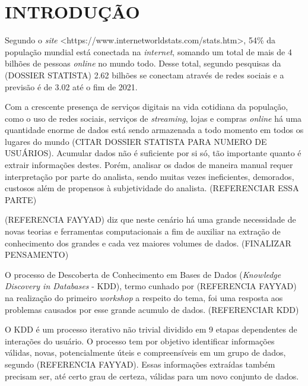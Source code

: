 
%

\chapter{INTRODUÇÃO}
\label{chap:introducao}

Segundo o \textit{site} <https://www.internetworldstats.com/stats.htm>, 54\% da população mundial está conectada na \textit{internet}, somando um total de mais de 4 bilhões de pessoas \textit{online} no mundo todo. Desse total, segundo pesquisas da (DOSSIER STATISTA) 2.62 bilhões se conectam através de redes sociais e a previsão é de 3.02 até o fim de 2021.

Com a crescente presença de serviços digitais na vida cotidiana da população, como o uso de redes sociais, serviços de \textit{streaming}, lojas e compras \textit{online} há uma quantidade enorme de dados está sendo armazenada a todo momento em todos os lugares do mundo (CITAR DOSSIER STATISTA PARA NUMERO DE USUÁRIOS). Acumular dados não é suficiente por si só, tão importante quanto é extrair informações destes. Porém, analisar os dados de maneira manual requer interpretação por parte do analista, sendo muitas vezes ineficientes, demorados, custosos além de propensos à subjetividade do analista. (REFERENCIAR ESSA PARTE)

(REFERENCIA FAYYAD) diz que neste cenário há uma grande necessidade de novas teorias e ferramentas computacionais a fim de auxiliar na extração de conhecimento dos grandes e cada vez maiores volumes de dados. (FINALIZAR PENSAMENTO)

O processo de Descoberta de Conhecimento em Bases de Dados (\textit{Knowledge Discovery in Databases} - KDD), termo cunhado por (REFERENCIA FAYYAD) na realização do primeiro \textit{workshop} a respeito do tema, foi uma resposta aos problemas causados por esse grande acumulo de dados. (REFERENCIAR KDD)

O KDD é um processo iterativo não trivial dividido em 9 etapas dependentes de interações do usuário. O processo tem por objetivo identificar informações válidas, novas, potencialmente úteis e compreensíveis em um grupo de dados, segundo (REFERENCIA FAYYAD). Essas informações extraídas também precisam ser, até certo grau de certeza, válidas para um novo conjunto de dados.

